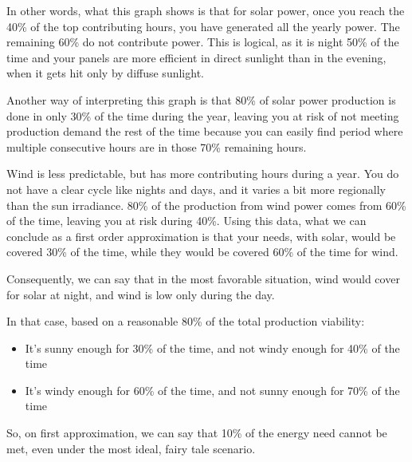 In other words, what this graph shows is that for solar power, once you reach the 40\% of the top contributing hours, you have generated all the yearly power. The remaining 60\% do not contribute power. This is logical, as it is night 50\% of the time and your panels are more efficient in direct sunlight than in the evening, when it gets hit only by diffuse sunlight.

Another way of interpreting this graph is that 80\% of solar power production is done in only 30\% of the time during the year, leaving you at risk of not meeting production demand the rest of the time because you can easily find period where multiple consecutive hours are in those 70\% remaining hours.

Wind is less predictable, but has more contributing hours during a year. You do not have a clear cycle like nights and days, and it varies a bit more regionally than the sun irradiance. 80\% of the production from wind power comes from 60\% of the time, leaving you at risk during 40\%. Using this data, what we can conclude as a first order approximation is that your needs, with solar, would be covered 30\% of the time, while they would be covered 60\% of the time for wind.

Consequently, we can say that in the most favorable situation, wind would cover for solar at night, and wind is low only during the day.

\begin{remark}
In that case, based on a reasonable 80\% of the total production viability:

\begin{itemize}
\item It's sunny enough for 30\% of the time, and not windy enough for 40\% of the time
\item It's windy enough for 60\% of the time, and not sunny enough for 70\% of the time
\end{itemize}

So, on first approximation, we can say that 10\% of the energy need cannot be met, even under the most ideal, fairy tale scenario.

\end{remark}

